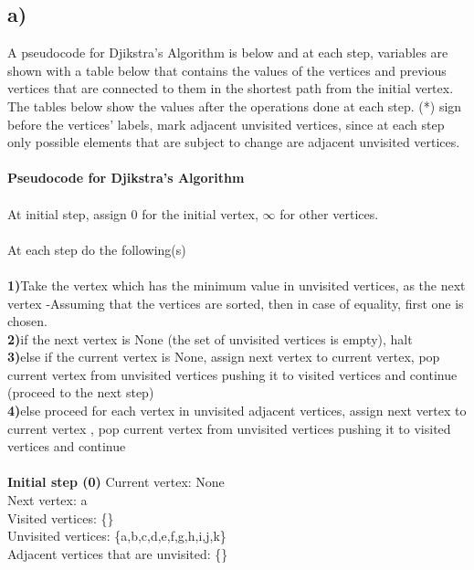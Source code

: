 \documentclass[11pt]{article}
\begin{document}
\subsection*{a)}
A pseudocode for Djikstra's Algorithm is below and at each step, variables are shown with a table below 
that contains the values of the vertices and previous vertices that are connected to them
in the shortest path from the initial vertex. The tables below show the values after the operations 
done at each step. (*) sign before the vertices' labels, mark adjacent unvisited vertices, since at each 
step only possible elements that are subject to change are adjacent unvisited vertices.
\\ \\
\textbf{Pseudocode for Djikstra's Algorithm}
\\ \\
At initial step, assign $0$ for the initial vertex, $\infty$ for other vertices.
\\ \\
At each step do the following(s)
\\ \\
\textbf{1)}Take the vertex which has the minimum value in unvisited vertices, as the next vertex
-Assuming that the vertices are sorted, then in case of equality, first one is chosen.\\
\textbf{2)}if the next vertex is None (the set of unvisited vertices is empty), halt\\
\textbf{3)}else if the current vertex is None, assign next vertex to current vertex, pop current vertex
from unvisited vertices pushing it to visited vertices and continue (proceed to the next step) \\
\textbf{4)}else proceed for each vertex in unvisited adjacent vertices, assign next vertex to current vertex
, pop current vertex from unvisited vertices pushing it to visited vertices and continue
\\ \\
\textbf{Initial step (0)} Current vertex: None\\
Next vertex: a\\
Visited vertices: \{\}\\
Unvisited vertices: \{a,b,c,d,e,f,g,h,i,j,k\}\\
Adjacent vertices that are unvisited: \{\}\\
\end{document}

